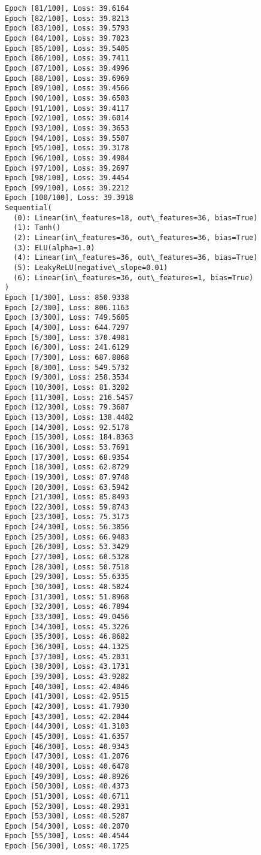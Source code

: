 \documentclass[11pt]{article}
\begin{document}
\begin{Verbatim}[commandchars=\\\{\}]
Epoch [81/100], Loss: 39.6164
Epoch [82/100], Loss: 39.8213
Epoch [83/100], Loss: 39.5793
Epoch [84/100], Loss: 39.7823
Epoch [85/100], Loss: 39.5405
Epoch [86/100], Loss: 39.7411
Epoch [87/100], Loss: 39.4996
Epoch [88/100], Loss: 39.6969
Epoch [89/100], Loss: 39.4566
Epoch [90/100], Loss: 39.6503
Epoch [91/100], Loss: 39.4117
Epoch [92/100], Loss: 39.6014
Epoch [93/100], Loss: 39.3653
Epoch [94/100], Loss: 39.5507
Epoch [95/100], Loss: 39.3178
Epoch [96/100], Loss: 39.4984
Epoch [97/100], Loss: 39.2697
Epoch [98/100], Loss: 39.4454
Epoch [99/100], Loss: 39.2212
Epoch [100/100], Loss: 39.3918
Sequential(
  (0): Linear(in\_features=18, out\_features=36, bias=True)
  (1): Tanh()
  (2): Linear(in\_features=36, out\_features=36, bias=True)
  (3): ELU(alpha=1.0)
  (4): Linear(in\_features=36, out\_features=36, bias=True)
  (5): LeakyReLU(negative\_slope=0.01)
  (6): Linear(in\_features=36, out\_features=1, bias=True)
)
Epoch [1/300], Loss: 850.9338
Epoch [2/300], Loss: 806.1163
Epoch [3/300], Loss: 749.5605
Epoch [4/300], Loss: 644.7297
Epoch [5/300], Loss: 370.4981
Epoch [6/300], Loss: 241.6129
Epoch [7/300], Loss: 687.8868
Epoch [8/300], Loss: 549.5732
Epoch [9/300], Loss: 258.3534
Epoch [10/300], Loss: 81.3282
Epoch [11/300], Loss: 216.5457
Epoch [12/300], Loss: 79.3687
Epoch [13/300], Loss: 138.4482
Epoch [14/300], Loss: 92.5178
Epoch [15/300], Loss: 184.8363
Epoch [16/300], Loss: 53.7691
Epoch [17/300], Loss: 68.9354
Epoch [18/300], Loss: 62.8729
Epoch [19/300], Loss: 87.9748
Epoch [20/300], Loss: 63.5942
Epoch [21/300], Loss: 85.8493
Epoch [22/300], Loss: 59.8743
Epoch [23/300], Loss: 75.3173
Epoch [24/300], Loss: 56.3856
Epoch [25/300], Loss: 66.9483
Epoch [26/300], Loss: 53.3429
Epoch [27/300], Loss: 60.5328
Epoch [28/300], Loss: 50.7518
Epoch [29/300], Loss: 55.6335
Epoch [30/300], Loss: 48.5824
Epoch [31/300], Loss: 51.8968
Epoch [32/300], Loss: 46.7894
Epoch [33/300], Loss: 49.0456
Epoch [34/300], Loss: 45.3226
Epoch [35/300], Loss: 46.8682
Epoch [36/300], Loss: 44.1325
Epoch [37/300], Loss: 45.2031
Epoch [38/300], Loss: 43.1731
Epoch [39/300], Loss: 43.9282
Epoch [40/300], Loss: 42.4046
Epoch [41/300], Loss: 42.9515
Epoch [42/300], Loss: 41.7930
Epoch [43/300], Loss: 42.2044
Epoch [44/300], Loss: 41.3103
Epoch [45/300], Loss: 41.6357
Epoch [46/300], Loss: 40.9343
Epoch [47/300], Loss: 41.2076
Epoch [48/300], Loss: 40.6478
Epoch [49/300], Loss: 40.8926
Epoch [50/300], Loss: 40.4373
Epoch [51/300], Loss: 40.6711
Epoch [52/300], Loss: 40.2931
Epoch [53/300], Loss: 40.5287
Epoch [54/300], Loss: 40.2070
Epoch [55/300], Loss: 40.4544
Epoch [56/300], Loss: 40.1725

\end{Verbatim}
\end{document}
